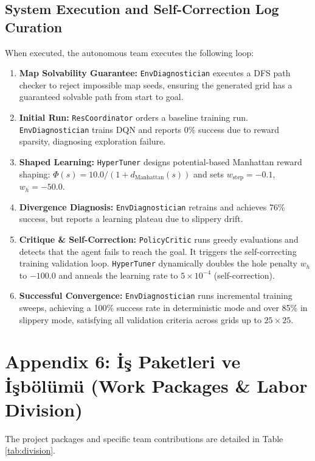\documentclass[conference]{IEEEtran}
\begin{document}
\subsection{System Execution and Self-Correction Log Curation}
When executed, the autonomous team executes the following loop:
\begin{enumerate}
\item \textbf{Map Solvability Guarantee:} \texttt{EnvDiagnostician} executes a DFS path checker to reject impossible map seeds, ensuring the generated grid has a guaranteed solvable path from start to goal.
\item \textbf{Initial Run:} \texttt{ResCoordinator} orders a baseline training run. \texttt{EnvDiagnostician} trains DQN and reports 0\% success due to reward sparsity, diagnosing exploration failure.
\item \textbf{Shaped Learning:} \texttt{HyperTuner} designs potential-based Manhattan reward shaping: $\Phi(s) = 10.0 / (1 + d_{\text{Manhattan}}(s))$ and sets $w_{\text{step}}=-0.1$, $w_h=-50.0$.
\item \textbf{Divergence Diagnosis:} \texttt{EnvDiagnostician} retrains and achieves 76\% success, but reports a learning plateau due to slippery drift.
\item \textbf{Critique \& Self-Correction:} \texttt{PolicyCritic} runs greedy evaluations and detects that the agent fails to reach the goal. It triggers the self-correcting training validation loop. \texttt{HyperTuner} dynamically doubles the hole penalty $w_h$ to $-100.0$ and anneals the learning rate to $5 \times 10^{-4}$ (self-correction).
\item \textbf{Successful Convergence:} \texttt{EnvDiagnostician} runs incremental training sweeps, achieving a 100\% success rate in deterministic mode and over 85\% in slippery mode, satisfying all validation criteria across grids up to $25\times25$.
\end{enumerate}

\section*{Appendix 6: İş Paketleri ve İşbölümü (Work Packages \& Labor Division)}
The project packages and specific team contributions are detailed in Table \ref{tab:division}.
\end{document}
